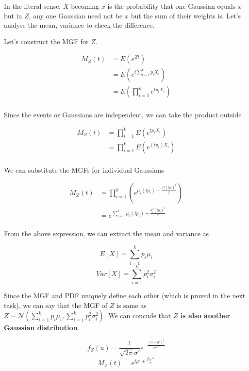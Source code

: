 \documentclass[openany]{book}
\begin{document}
        In the literal sense, $X$ becoming $x$ is the probability that one Gaussian equals $x$ but in $Z$, any one Gaussian
        need not be $x$ but the sum of their weights is. Let's analyse the mean, variance to check the difference. 
        
        Let's construct the MGF for $Z$.
        
        \begin{align*}
            M_Z(t) &= E(e^{Zt}) \\
            &= E(e^{t \sum_{i=1}^{k} p_i X_i }) \\
            &= E(\prod_{i=1}^{k} e^{t p_i X_i}) \\      
        \end{align*}
        
        Since the events or Gaussians are independent, we can take the product outside
        
        \begin{align*}
            M_Z(t) &= \prod_{i=1}^{k} E(e^{t p_i X_i}) \\ 
            &= \prod_{i=1}^{k} E(e^{(t p_i) X_i}) \\ 
        \end{align*}
        
        We can substitute the MGFs for individual Gaussians 
        
        \begin{align*}
            M_Z(t) &= \prod_{i=1}^{k} (e^{\mu_i (t p_i) + \frac{\sigma_i ^2 (t p_i)^2}{2}}) \\ 
            &= e^{ \sum_{i=1}^{k} \mu_i (t p_i) + \frac{\sigma_i ^2 (t p_i)^2}{2}} \\
        \end{align*}
        
        From the above expression, we can extract the mean and variance as 
        
        
            \[ \boxed{E[X] = \sum_{i=1}^{k} p_i \mu_i} \]
            \[ \boxed{Var[X] = \sum_{i=1}^{k} p_i^2 \sigma_i^2} \]
        
        Since the MGF and PDF uniquely define each other (which is proved in the next task), we can say that 
        the MGF of $Z$ is same as $Z \sim \mathcal{N}(\sum_{i=1}^{k} p_i \mu_i, \sum_{i=1}^{k} p_i^2 \sigma_i^2) $. 
        We can concude that \textbf{$Z$ is also another Gaussian distribution}.  
        
            \[
            \boxed{ f_Z(u) = \frac{1}{\sqrt{2\pi}\sigma'} e^{-\frac{(u-\mu')^2}{2 \sigma'^2}} }
            \]
            \[ \boxed{ M_Z(t) = e^{ t \mu' + \frac{t^2 \sigma'^2}{2}} } \]
        
\end{document}
